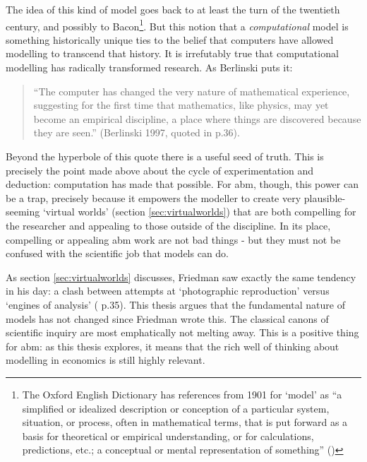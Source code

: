 The idea of this kind of model goes back to at least the turn of the twentieth century, and possibly to Bacon\footnote{The Oxford English Dictionary has references from 1901 for `model' as ``a simplified or idealized description or conception of a particular system, situation, or process, often in mathematical terms, that is put forward as a basis for theoretical or empirical understanding, or for calculations, predictions, etc.; a conceptual or mental representation of something'' (\citealt{oed_oxford_2002}) }. But this notion that a \emph{computational} model is something historically unique ties to the belief that computers have allowed modelling to transcend that history. It is irrefutably true that computational modelling has radically transformed research. As Berlinski puts it:

\begin{quote}
``The computer has changed the very nature of mathematical experience, suggesting for the first time that mathematics, like physics, may yet become an empirical discipline, a place where things are discovered because they are seen.'' (Berlinski 1997, quoted in \citealt{gold_proof_2008} p.36).
\end{quote}

Beyond the hyperbole of this quote there is a useful seed of truth. This is precisely the point made above about the cycle of experimentation and deduction: computation has made that possible. For \gls{abm}, though, this power can be a trap, precisely because it empowers the modeller to create very plausible-seeming `virtual worlds' (section \ref{sec:virtualworlds}) that are both compelling for the researcher and appealing to those outside of the discipline. In its place, compelling or appealing \gls{abm} work are not bad things - but they must not be confused with the scientific job that models can do. 

As section \ref{sec:virtualworlds} discusses, Friedman saw exactly the same tendency in his day: a clash between attempts at `photographic reproduction' versus `engines of analysis' (\citealt{friedman_essays_1953} p.35). This thesis argues that the fundamental nature of models has not changed since Friedman wrote this. The classical canons of scientific inquiry are most emphatically not melting away. This is a positive thing for \gls{abm}: as this thesis explores, it means that the rich well of thinking about modelling in economics is still highly relevant. 


